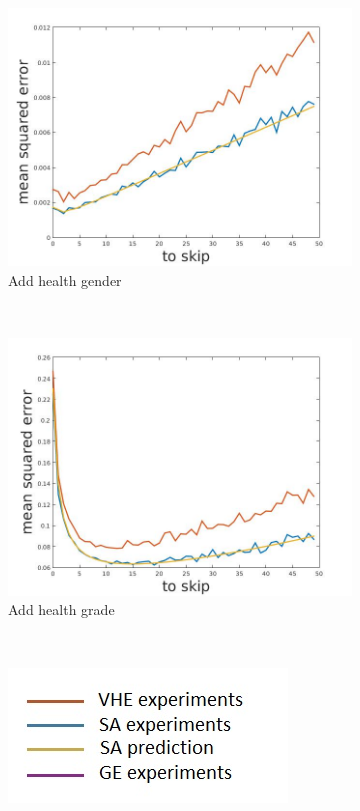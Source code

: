 \documentclass[12pt]{report}
\begin{document}
\begin{figure}[h]
    \begin{subfigure}[b]{0.3\textwidth}
        \includegraphics[width=\textwidth]{estimators_sex}
        \caption{ Add health gender}

    \end{subfigure}
    ~
    \begin{subfigure}[b]{0.3\textwidth}
        \includegraphics[width=\textwidth]{estimators_grade}
        \caption{ Add health grade }

    \end{subfigure}
    ~
    \begin{subfigure}[b]{0.3\textwidth}
        \includegraphics[width=\textwidth]{legend}
    \end{subfigure}
    


\end{figure}
\end{document}

